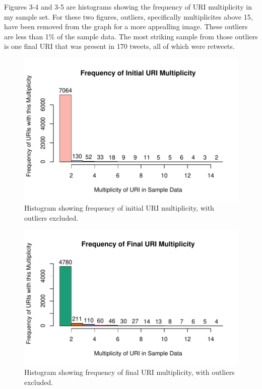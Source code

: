 \documentclass[a4paper,12pt]{article}
\begin{document}
Figures 3-4 and 3-5 are histograms showing the frequency of URI multiplicity in my sample set.
For these two figures, outliers, specifically multiplicites above 15, have been removed from the
graph for a more appealling image. These outliers are less than 1\% of the sample data. The most
striking sample from those outliers is one final URI that was present in 170 tweets, all of which
were retweets.
\begin{figure}[H]
    \centering
    \includegraphics{stats/frequency_initial_uri_multiplicity.pdf}
    \caption{Histogram showing frequency of initial URI multiplicity, with outliers excluded.}
\end{figure}
\begin{figure}[H]
    \centering
    \includegraphics{stats/frequency_final_uri_multiplicity.pdf}
    \caption{Histogram showing frequency of final URI multiplicity, with outliers excluded.}
\end{figure}
\end{document}
